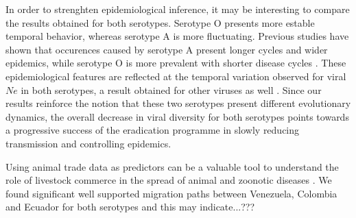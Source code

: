 \documentclass[10pt]{article}
\begin{document}
In order to strenghten epidemiological inference, it may be interesting to compare the results obtained for both serotypes. Serotype O presents more estable temporal behavior, whereas serotype A is more fluctuating.
Previous studies have shown that occurences caused by serotype A present longer cycles and wider epidemics, while serotype O is more prevalent with shorter disease cycles \cite{colombiatime}.
These epidemiological features are reflected at the temporal variation observed for viral $Ne$ in both serotypes, a result obtained for other viruses as well \cite{Bennett2010,Pybus2003}. 
Since our results reinforce the notion that these two serotypes present different evolutionary dynamics, the overall decrease in viral diversity for both serotypes points towards a progressive success of the eradication programme in slowly reducing transmission and controlling epidemics.

Using animal trade data as predictors can be a valuable tool to understand the role of livestock commerce in the spread of animal and zoonotic diseases \cite{Nelson2011}.
We found significant well supported migration paths between Venezuela, Colombia and Ecuador for both serotypes and this may indicate...???%
\end{document}
